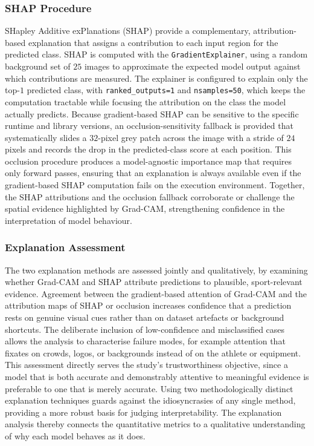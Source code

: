 \subsubsection{SHAP Procedure}
\label{subsubsec:method-shap}

SHapley Additive exPlanations (SHAP) \citep{lundberg2017shap} provide a complementary, attribution-based explanation that assigns a contribution to each input region for the predicted class.
SHAP is computed with the \texttt{GradientExplainer}, using a random background set of $25$ images to approximate the expected model output against which contributions are measured.
The explainer is configured to explain only the top-$1$ predicted class, with \texttt{ranked\_outputs=1} and \texttt{nsamples=50}, which keeps the computation tractable while focusing the attribution on the class the model actually predicts.
Because gradient-based SHAP can be sensitive to the specific runtime and library versions, an occlusion-sensitivity fallback is provided that systematically slides a $32$-pixel grey patch across the image with a stride of $24$ pixels and records the drop in the predicted-class score at each position.
This occlusion procedure produces a model-agnostic importance map that requires only forward passes, ensuring that an explanation is always available even if the gradient-based SHAP computation fails on the execution environment.
Together, the SHAP attributions and the occlusion fallback corroborate or challenge the spatial evidence highlighted by Grad-CAM, strengthening confidence in the interpretation of model behaviour.

\subsubsection{Explanation Assessment}
\label{subsubsec:method-explanation-assessment}

The two explanation methods are assessed jointly and qualitatively, by examining whether Grad-CAM and SHAP attribute predictions to plausible, sport-relevant evidence.
Agreement between the gradient-based attention of Grad-CAM and the attribution maps of SHAP or occlusion increases confidence that a prediction rests on genuine visual cues rather than on dataset artefacts or background shortcuts.
The deliberate inclusion of low-confidence and misclassified cases allows the analysis to characterise failure modes, for example attention that fixates on crowds, logos, or backgrounds instead of on the athlete or equipment.
This assessment directly serves the study's trustworthiness objective, since a model that is both accurate and demonstrably attentive to meaningful evidence is preferable to one that is merely accurate.
Using two methodologically distinct explanation techniques guards against the idiosyncrasies of any single method, providing a more robust basis for judging interpretability.
The explanation analysis thereby connects the quantitative metrics to a qualitative understanding of why each model behaves as it does.

